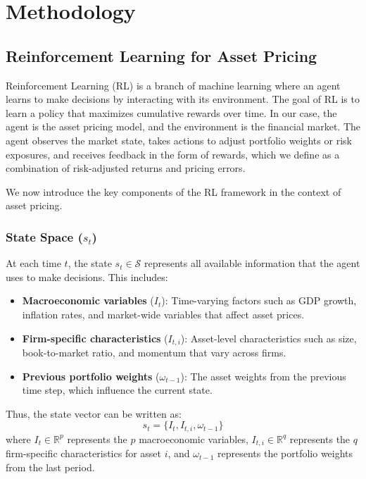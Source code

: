 \section{Methodology}

\subsection{Reinforcement Learning for Asset Pricing}

Reinforcement Learning (RL) is a branch of machine learning where an agent learns to make decisions by interacting with its environment. The goal of RL is to learn a policy that maximizes cumulative rewards over time. In our case, the agent is the asset pricing model, and the environment is the financial market. The agent observes the market state, takes actions to adjust portfolio weights or risk exposures, and receives feedback in the form of rewards, which we define as a combination of risk-adjusted returns and pricing errors.

We now introduce the key components of the RL framework in the context of asset pricing.

\subsubsection{State Space ($s_t$)}

At each time $t$, the state $s_t \in \mathcal{S}$ represents all available information that the agent uses to make decisions. This includes:
\begin{itemize}
    \item \textbf{Macroeconomic variables} ($I_t$): Time-varying factors such as GDP growth, inflation rates, and market-wide variables that affect asset prices.
    \item \textbf{Firm-specific characteristics} ($I_{t, i}$): Asset-level characteristics such as size, book-to-market ratio, and momentum that vary across firms.
    \item \textbf{Previous portfolio weights} ($\omega_{t-1}$): The asset weights from the previous time step, which influence the current state.
\end{itemize}

Thus, the state vector can be written as:
\[
s_t = \{ I_t, I_{t, i}, \omega_{t-1} \}
\]
where $I_t \in \mathbb{R}^p$ represents the $p$ macroeconomic variables, $I_{t, i} \in \mathbb{R}^q$ represents the $q$ firm-specific characteristics for asset $i$, and $\omega_{t-1}$ represents the portfolio weights from the last period. 

